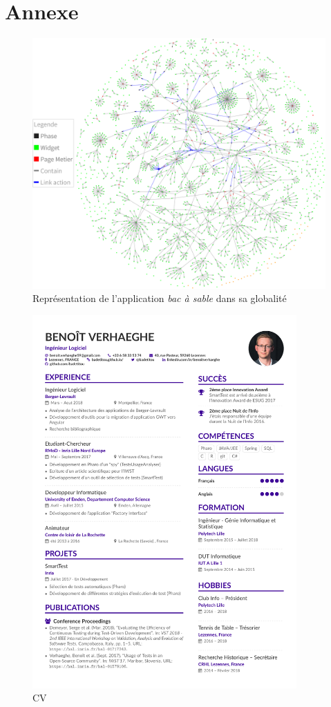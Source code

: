 \hypertarget{annexe}{%
\section{Annexe}\label{annexe}}

\hypertarget{firework}{%
\begin{figure}
\centering
\includegraphics{figures/firework.png}
\caption{Représentation de l'application \emph{bac à sable} dans sa
globalité}\label{firework}
\end{figure}
}

\hypertarget{CV}{%
\begin{figure}
\centering
\includegraphics[width=0.9\textwidth,height=\textheight]{cv/cv.pdf}
\caption{CV}\label{CV}
\end{figure}
}
